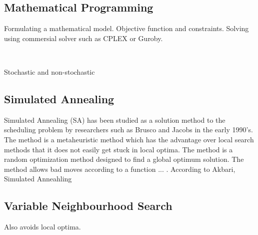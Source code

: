 \subsection{Mathematical Programming}

Formulating a mathematical model. Objective function and constraints. Solving using commersial solver such as CPLEX or Guroby.




\ %


Stochastic and non-stochastic

\subsection{Simulated Annealing}

Simulated Annealing (SA) has been studied as a solution method to the scheduling problem by researchers such as Brusco and Jacobs in the early 1990's. The method is a metaheuristic method which has the advantage over local search methods that it does not easily get stuck in local optima. The method is a random optimization method designed to find a global optimum solution. The method allows bad moves according to a function ... . 
According to Akbari, Simulated Anneahling 

\subsection{Variable Neighbourhood Search}

Also avoids local optima. 


